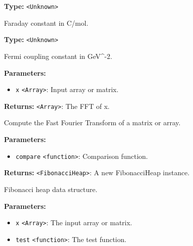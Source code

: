 \documentclass[12pt,a4paper]{article}
\begin{document}
\noindent \textbf{Type:} \texttt{<Unknown>}

\noindent Faraday constant in C/mol.

\vspace{5mm}
\noindent {}\vspace{4mm}


\noindent \textbf{Type:} \texttt{<Unknown>}

\noindent Fermi coupling constant in GeV\textasciicircum{}-2.

\vspace{5mm}
\noindent {}


\noindent \textbf{Parameters:}
\begin{itemize}
  \item \texttt{x} \texttt{<Array>}: Input array or matrix.
\end{itemize}

\noindent \textbf{Returns:} \texttt{<Array>}: The FFT of x.

\noindent Compute the Fast Fourier Transform of a matrix or array.

\vspace{5mm}
\noindent {}


\noindent \textbf{Parameters:}
\begin{itemize}
  \item \texttt{compare} \texttt{<function>}: Comparison function.
\end{itemize}

\noindent \textbf{Returns:} \texttt{<FibonacciHeap>}: A new FibonacciHeap instance.

\noindent Fibonacci heap data structure.

\vspace{5mm}
\noindent {}


\noindent \textbf{Parameters:}
\begin{itemize}
  \item \texttt{x} \texttt{<Array>}: The input array or matrix.
  \item \texttt{test} \texttt{<function>}: The test function.
\end{itemize}
\end{document}
